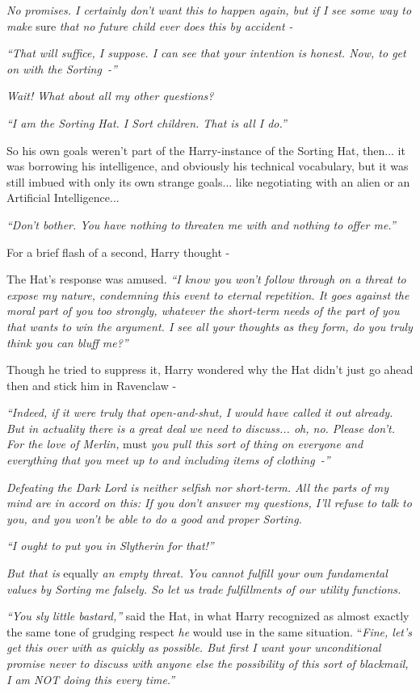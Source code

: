 \emph{No promises. I certainly don't want this to happen again, but if I see some way to make} sure \emph{that no future child ever does this by accident -}

\emph{``That will suffice, I suppose. I can see that your intention is honest. Now, to get on with the Sorting~-''}

\emph{Wait! What about all my other questions?}

\emph{``I am the Sorting Hat. I Sort children. That is all I do.''}

So his own goals weren't part of the Harry-instance of the Sorting Hat, then... it was borrowing his intelligence, and obviously his technical vocabulary, but it was still imbued with only its own strange goals... like negotiating with an alien or an Artificial Intelligence...

\emph{``Don't bother. You have nothing to threaten me with and nothing to offer me.''}

For a brief flash of a second, Harry thought -

The Hat's response was amused. \emph{``I know you won't follow through on a threat to expose my nature, condemning this event to eternal repetition. It goes against the moral part of you too strongly, whatever the short-term needs of the part of you that wants to win the argument. I see all your thoughts as they form, do you truly think you can bluff me?''}

Though he tried to suppress it, Harry wondered why the Hat didn't just go ahead then and stick him in Ravenclaw -

\emph{``Indeed, if it were truly that open-and-shut, I would have called it out already. But in actuality there is a great deal we need to discuss... oh, no. Please don't. For the love of Merlin,} must \emph{you pull this sort of thing on everyone and everything that you meet up to and including items of clothing~-''}

\emph{Defeating the Dark Lord is neither selfish nor short-term. All the parts of my mind are in accord on this: If you don't answer my questions, I'll refuse to talk to you, and you won't be able to do a good and proper Sorting.}

\emph{``I ought to put you in Slytherin for that!''}

\emph{But that is} equally \emph{an empty threat. You cannot fulfill your own fundamental values by Sorting me falsely. So let us trade fulfillments of our utility functions.}

\emph{``You sly little bastard,''} said the Hat, in what Harry recognized as almost exactly the same tone of grudging respect \emph{he} would use in the same situation. ``\emph{Fine, let's get this over with as quickly as possible. But first I want your unconditional promise never to discuss with anyone else the possibility of this sort of blackmail, I am NOT doing this every time.''}

